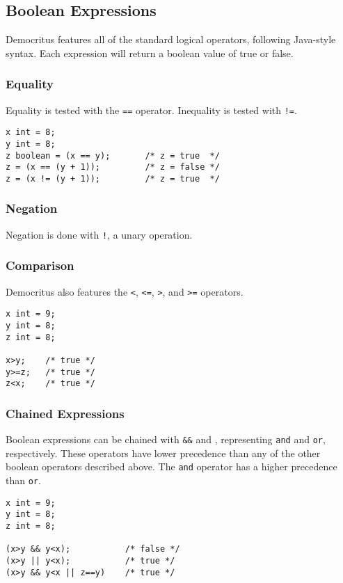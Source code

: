 	\subsection{Boolean Expressions}
		Democritus features all of the standard logical operators, following Java-style syntax. Each expression will return a boolean value of true or false.

        \subsubsection{Equality}
            Equality is tested with the \texttt{==} operator. Inequality is tested with \texttt{!=}. 
            \begin{lstlisting}
x int = 8;
y int = 8;
z boolean = (x == y);		/* z = true  */
z = (x == (y + 1));			/* z = false */
z = (x != (y + 1));			/* z = true  */
			\end{lstlisting}
			
		\subsubsection{Negation}
			Negation is done with \texttt{!}, a unary operation.

        \subsubsection{Comparison}
            Democritus also features the \texttt{\textless}, \texttt{\textless =}, \texttt{\textgreater}, and \texttt{\textgreater =} operators.  
            
            \begin{lstlisting}
x int = 9;
y int = 8;
z int = 8;

x>y;    /* true */
y>=z;   /* true */
z<x;    /* true */
            \end{lstlisting}

        \subsubsection{Chained Expressions}
            Boolean expressions can be chained with \texttt{\&\&} and \texttt{\textbar\textbar}, representing \texttt{and} and \texttt{or}, respectively. These operators have lower precedence than any of the other boolean operators described above. The \texttt{and} operator has a higher precedence than \texttt{or}.

            \begin{lstlisting}
x int = 9;
y int = 8;
z int = 8;

(x>y && y<x);			/* false */
(x>y || y<x);			/* true */
(x>y && y<x || z==y)	/* true */
            \end{lstlisting}
            
